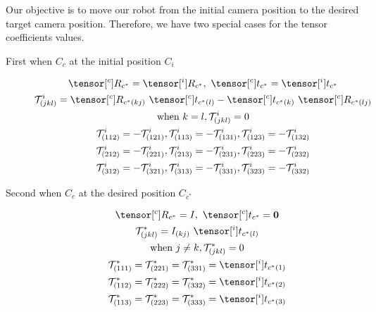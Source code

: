 \pagebreak

Our objective is to move our robot from the initial camera position to the desired target camera position. Therefore, we have two special cases for the tensor coefficients values.
\begin{description}
  \item[First when $C_c$ at the initial position $C_i$] \hfill
    \begin{equation}
    \begin{gathered}
      \tensor[^{c}]{R}{_{c^{*}}} = \tensor[^{i}]{R}{_{c^{*}}}, \ \tensor[^{c}]{t}{_{c^{*}}} = \tensor[^{i}]{t}{_{c^{*}}}\\
      \mathcal{T}_{(jkl)}^{i} = \tensor[^{c}]{R}{_{c^{*}(kj)}} \ \tensor[^{c}]{t}{_{c^{*}(l)}} - \tensor[^{c}]{t}{_{c^{*}(k)}} \ \tensor[^{c}]{R}{_{c^{*}(lj)}}\\
      \text{when } k = l, \mathcal{T}_{(jkl)}^{i} = 0\\
      \mathcal{T}_{(112)}^{i} = -\mathcal{T}_{(121)}^{i}, \mathcal{T}_{(113)}^{i} = -\mathcal{T}_{(131)}^{i}, \mathcal{T}_{(123)}^{i} = -\mathcal{T}_{(132)}^{i}\\
      \mathcal{T}_{(212)}^{i} = -\mathcal{T}_{(221)}^{i}, \mathcal{T}_{(213)}^{i} = -\mathcal{T}_{(231)}^{i}, \mathcal{T}_{(223)}^{i} = -\mathcal{T}_{(232)}^{i}\\
      \mathcal{T}_{(312)}^{i} = -\mathcal{T}_{(321)}^{i}, \mathcal{T}_{(313)}^{i} = -\mathcal{T}_{(331)}^{i}, \mathcal{T}_{(323)}^{i} = -\mathcal{T}_{(332)}^{i}
    \end{gathered}\label{eq:tensorcoeffinitial}
    \end{equation}
  \item[Second when $C_c$ at the desired position $C_{c^*}$] \hfill
    \begin{equation}
    \begin{gathered}
      \tensor[^{c}]{R}{_{c^{*}}} = I, \ \tensor[^{c}]{t}{_{c^{*}}} = \bf{0}\\
      \mathcal{T}_{(jkl)}^{*} = I_{(kj)} \ \tensor[^{i}]{t}{_{c^{*}(l)}}\\
      \text{when } j \neq k, \mathcal{T}_{(jkl)}^{*} = 0\\
      \mathcal{T}_{(111)}^{*} = \mathcal{T}_{(221)}^{*} = \mathcal{T}_{(331)}^{*} = \tensor[^{i}]{t}{_{c^{*}(1)}}\\
      \mathcal{T}_{(112)}^{*} = \mathcal{T}_{(222)}^{*} = \mathcal{T}_{(332)}^{*} = \tensor[^{i}]{t}{_{c^{*}(2)}}\\
      \mathcal{T}_{(113)}^{*} = \mathcal{T}_{(223)}^{*} = \mathcal{T}_{(333)}^{*} = \tensor[^{i}]{t}{_{c^{*}(3)}}
    \end{gathered}\label{eq:tensorcoeffdesired}
  \end{equation}
\end{description}

